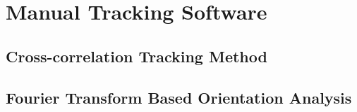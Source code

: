 

\chapter{Manual Tracking Software}
\label{manual-tracking-software}


\section{Cross-correlation Tracking Method}
\label{cross-correlation-tracking-method}

\section{Fourier Transform Based Orientation Analysis}
\label{fourier-transform-based-orientation-analysis}
